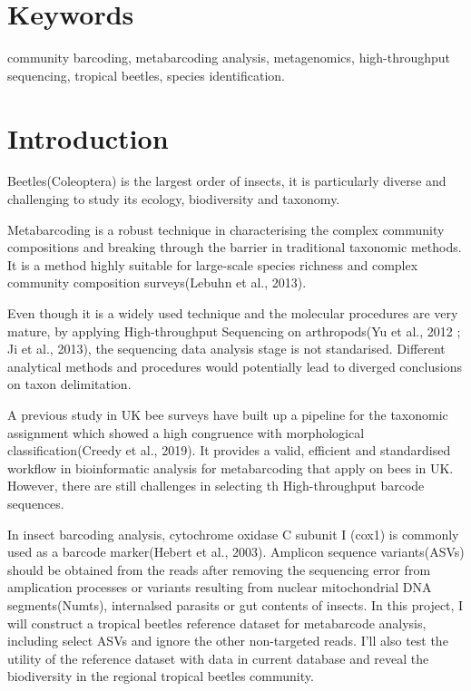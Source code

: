 \documentclass[11pt, a4paper]{article}
\begin{document}
\linenumbers
\section*{Keywords}
community barcoding,   metabarcoding analysis,   metagenomics,   high-throughput sequencing,   tropical beetles,   species identification.

\section*{Introduction}
Beetles(Coleoptera) is the largest order of insects, it is particularly diverse and challenging to study its ecology, biodiversity and taxonomy. 

Metabarcoding is a robust technique in characterising the complex community compositions and breaking through the barrier in traditional taxonomic methods. It is a method highly suitable for large-scale species richness and complex community composition surveys(Lebuhn et al., 2013).

Even though it is a  widely used technique and the molecular procedures are very mature, by applying High-throughput Sequencing on arthropods(Yu et al., 2012 ; Ji et al., 2013), the sequencing data analysis stage is not standarised. Different analytical methods  and procedures would potentially lead to diverged conclusions on taxon delimitation. 

A previous study in UK bee surveys have built up a pipeline for the taxonomic assignment which showed a high congruence with morphological classification(Creedy et al., 2019). It provides a valid, efficient and standardised workflow in bioinformatic analysis for metabarcoding that apply on bees in UK. However, there are still challenges in selecting th High-throughput barcode sequences.

In insect barcoding analysis, cytochrome oxidase C subunit I (cox1) is commonly used as a barcode marker(Hebert et al., 2003).  Amplicon sequence variants(ASVs) should be obtained from the reads after removing the sequencing error from amplication processes or variants resulting from nuclear mitochondrial DNA segments(Numts), internalsed parasits or gut contents of insects. In this project, I will construct a tropical beetles reference dataset for metabarcode analysis, including select ASVs and ignore the other non-targeted reads. I’ll also test the utility of the reference dataset with data in current database and reveal the biodiversity in the regional tropical beetles community. 
\end{document}
